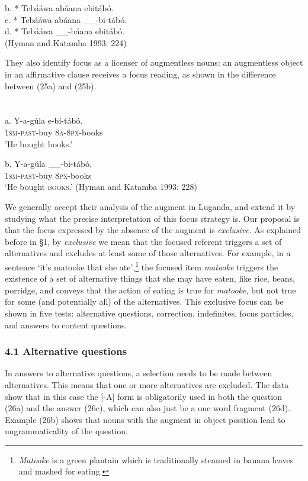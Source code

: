 \documentclass[output=paper]{langsci/langscibook}
\begin{document}
\gll b.  * Tebááwa abáana ebitábó.\\
\gll c.  * Tebááwa abáana \_\_-bi-tábó.\\
\gll d.  * Tebááwa \_\_-báana ebitábó. \\
\glt (Hyman and Katamba 1993: 224)
\z

They also identify focus as a licenser of augmentless nouns: an augmentless object in an affirmative clause receives a focus reading, as shown in the difference between (25a) and (25b).

\chapter[   ]{   }
\gll a.  Y-a-gúla    e-bí-tábó.\\
       \textsc{1sm}{}-\textsc{past}{}-buy  \textsc{8a}{}-\textsc{8px}{}-books\\
\glt   'He bought books.'
\z

\gll b.  Y-a-gúla    \_\_-bi-tábó.\\
       \textsc{1sm}{}-\textsc{past}{}-buy       \textsc{8px}{}-books\\
\glt   ‘He bought \textsc{books}.’ (Hyman and Katamba 1993: 228)
\z

We generally accept their analysis of the augment in Luganda, and extend it by studying what the precise interpretation of this focus strategy is. Our proposal is that the focus expressed by the absence of the augment is \textit{exclusive}. As explained before in §1, by \textit{exclusive} we mean that the focused referent triggers a set of alternatives and excludes at least some of those alternatives. For example, in a sentence ‘it’s matooke that she ate’,\footnote{ \textit{Matooke} is a green plantain which is traditionally steamed in banana leaves and mashed for eating.  }{ }the focused item \textit{matooke} triggers the existence of a set of alternative things that she may have eaten, like rice, beans, porridge, and conveys that the action of eating is true for \textit{matooke}, but not true for some (and potentially all) of the alternatives. This exclusive focus can be shown in five tests: alternative questions, correction, indefinites, focus particles, and answers to content questions.

\subsection{ 4.1 Alternative questions}

In answers to alternative questions, a selection needs to be made between alternatives. This means that one or more alternatives are excluded. The data show that in this case the [-A] form is obligatorily used in both the question (26a) and the answer (26c), which can also just be a one word fragment (26d). Example (26b) shows that nouns with the augment in object position lead to ungrammaticality of the question. 
\end{document}
